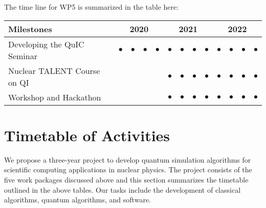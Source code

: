 \documentclass[11pt]{article}
\begin{document}
The time line for WP5 is summarized in the table here:
\begin{footnotesize}
\begin{center}
\begin{tabular}{|l|c|c|c|c|c|c|c|c|c|c|c|c|}
\hline
\multicolumn{1}{|l}{Milestones } & \multicolumn{4}{|c|}{ 2020 } & \multicolumn{4}{c|}{ 2021 } & \multicolumn{4}{c|}{ 2022 } \\
\hline
Developing the QuIC Seminar &$\bullet$ &$\bullet$ &$\bullet$ &$\bullet$ &$\bullet$ &$\bullet$ &$\bullet$ &$\bullet$ &$\bullet$ &$\bullet$ &$\bullet$ &$\bullet$  \\
\hline
Nuclear TALENT Course on QI  & & & & &$\bullet$ &$\bullet$ &$\bullet$ &$\bullet$ &$\bullet$ &$\bullet$ &$\bullet$ &$\bullet$  \\
\hline
Workshop and Hackathon & & & & &$\bullet$ &$\bullet$ &$\bullet$ &$\bullet$ &$\bullet$ &$\bullet$ &$\bullet$ &$\bullet$  \\
\hline


\end{tabular}
\end{center}
\end{footnotesize}


\section{Timetable of Activities}
We propose a three-year project to develop quantum simulation algorithms for scientific computing applications in nuclear physics. The project consists of the five work packages discussed above and this section summarizes the timetable outlined in the above tables. Our tasks include the development of classical algorithms, quantum algorithms, and software.
\end{document}
